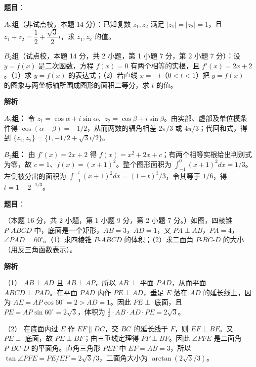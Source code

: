 \begin{answer}

\textbf{题目}：

$A_2$组（非试点校，本题 14 分）：已知复数 $z_1,z_2$ 满足 $|z_1|=|z_2|=1$，且 $z_1+z_2=\dfrac12+\dfrac{\sqrt3}{2}i$，求 $z_1,z_2$ 的值。

$B_2$组（试点校，本题 14 分，共 2 小题，第 1 小题 7 分，第 2 小题 7 分）：设 $y=f(x)$ 是二次函数，方程 $f(x)=0$ 有两个相等的实根，且 $f'(x)=2x+2$。（1）求 $y=f(x)$ 的表达式；（2）若直线 $x=-t$（$0<t<1$）把 $y=f(x)$ 的图象与两坐标轴所围成图形的面积二等分，求 $t$ 的值。

\textbf{解析}

\textbf{$A_2$组：} 令 $z_1=\cos\alpha+i\sin\alpha$、$z_2=\cos\beta+i\sin\beta$。由实部、虚部及单位模条件得 $\cos(\alpha-\beta)=-1/2$，从而两数的辐角相差 $2\pi/3$ 或 $4\pi/3$；代回和式，得到 $\{z_1,z_2\}=\{1,-1/2+\sqrt3 i/2\}$。

\textbf{$B_2$组：} 由 $f'(x)=2x+2$ 得 $f(x)=x^2+2x+c$；有两个相等实根给出判别式为零，故 $c=1$、$f(x)=(x+1)^2$。整个图形面积为 $\int_{-1}^0(x+1)^2dx=1/3$。左侧被分出的面积为 $\int_{-1}^{-t}(x+1)^2dx=(1-t)^3/3$，令其等于 $1/6$，得 $t=1-2^{-1/3}$。


\end{answer}
\begin{answer}

\textbf{题目}：

（本题 16 分，共 2 小题，第 1 小题 9 分，第 2 小题 7 分。）如图，四棱锥 $P\text{-}ABCD$ 中，底面是一个矩形，$AB=3$，$AD=1$，又 $PA\perp AB$，$PA=4$，$\angle PAD=60^\circ$。（1）求四棱锥 $P\text{-}ABCD$ 的体积；（2）求二面角 $P\text{-}BC\text{-}D$ 的大小（用反三角函数表示）。
\nopagebreak[4]
\begin{center}\end{center}
\nopagebreak[4]
\textbf{解析}

（1） $AB\perp AD$ 且 $AB\perp AP$，所以 $AB\perp$ 平面 $PAD$，从而平面 $ABCD\perp PAD$。在平面 $PAD$ 内作 $PE\perp AD$，垂足 $E$ 落在 $AD$ 的延长线上，因为 $AE=AP\cos60^\circ=2>AD=1$。因此 $PE\perp$ 底面，且 $PE=AP\sin60^\circ=2\sqrt3$，体积为 $\frac13\cdot AB\cdot AD\cdot PE=2\sqrt3$。

（2） 在底面内过 $E$ 作 $EF\parallel DC$，交 $BC$ 的延长线于 $F$，则 $EF\perp BF$。又 $PE\perp$ 底面，故 $PE\perp BF$；由三垂线定理得 $PF\perp BF$。因此 $\angle PFE$ 是二面角 $P\text{-}BC\text{-}D$ 的平面角。直角三角形 $PEF$ 中 $EF=AB=3$，所以 $\tan\angle PFE=PE/EF=2\sqrt3/3$，二面角大小为 $\arctan(2\sqrt3/3)$。
\nopagebreak[4]
\begin{center}\end{center}
\nopagebreak[4]

\end{answer}
